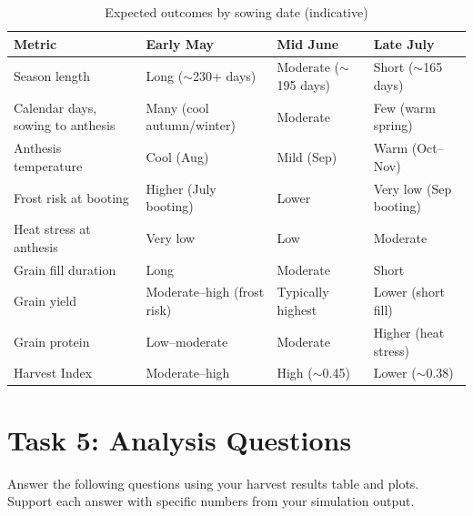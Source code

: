 \begin{table}[H]
\centering
\caption{Expected outcomes by sowing date (indicative)}
\label{tab:sowing-date}
\begin{tabularx}{\textwidth}{l|X|X|X}
\toprule
\textbf{Metric} & \textbf{Early May} & \textbf{Mid June} & \textbf{Late July} \\
\midrule
Season length & Long ($\sim$230+ days) & Moderate ($\sim$195 days) & Short ($\sim$165 days) \\
Calendar days, sowing to anthesis & Many (cool autumn/winter) & Moderate & Few (warm spring) \\
Anthesis temperature & Cool (Aug) & Mild (Sep) & Warm (Oct--Nov) \\
Frost risk at booting & Higher (July booting) & Lower & Very low (Sep booting) \\
Heat stress at anthesis & Very low & Low & Moderate \\
Grain fill duration & Long & Moderate & Short \\
Grain yield & Moderate--high (frost risk) & Typically highest & Lower (short fill) \\
Grain protein & Low--moderate & Moderate & Higher (heat stress) \\
Harvest Index & Moderate--high & High ($\sim$0.45) & Lower ($\sim$0.38) \\
\bottomrule
\end{tabularx}
\end{table}

\section{Task 5: Analysis Questions}

Answer the following questions using your harvest results table and plots. Support each answer with specific numbers from your simulation output.

